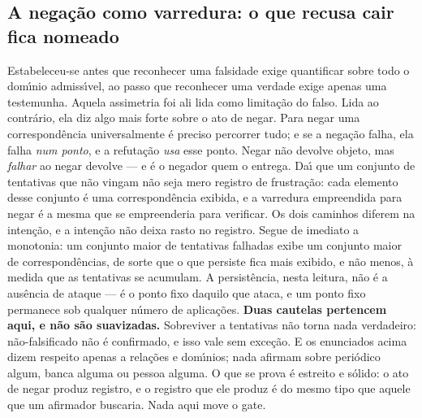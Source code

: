 \documentclass[11pt]{article}
\theoremstyle{definition}\newtheorem{deriv}{Derivação}
\begin{document}
\subsection*{A nega\c{c}\~ao como varredura: o que recusa cair fica nomeado}Estabeleceu-se antes que reconhecer uma falsidade exige quantificar sobre todo o dom\'\i{}nio admiss\'\i{}vel, ao passo que reconhecer uma verdade exige apenas uma testemunha. Aquela assimetria foi ali lida como limita\c{c}\~ao do falso. Lida ao contr\'ario, ela diz algo mais forte sobre o ato de negar. Para negar uma correspond\^encia universalmente \'e preciso percorrer tudo; e se a nega\c{c}\~ao falha, ela falha \emph{num ponto}, e a refuta\c{c}\~ao \emph{usa} esse ponto. Negar n\~ao devolve objeto, mas \emph{falhar} ao negar devolve --- e \'e o negador quem o entrega. Da\'\i{} que um conjunto de tentativas que n\~ao vingam n\~ao seja mero registro de frustra\c{c}\~ao: cada elemento desse conjunto \'e uma correspond\^encia exibida, e a varredura empreendida para negar \'e a mesma que se empreenderia para verificar. Os dois caminhos diferem na inten\c{c}\~ao, e a inten\c{c}\~ao n\~ao deixa rasto no registro. Segue de imediato a monotonia: um conjunto maior de tentativas falhadas exibe um conjunto maior de correspond\^encias, de sorte que o que persiste fica mais exibido, e n\~ao menos, \`a medida que as tentativas se acumulam. A persist\^encia, nesta leitura, n\~ao \'e a aus\^encia de ataque --- \'e o ponto fixo daquilo que ataca, e um ponto fixo permanece sob qualquer n\'umero de aplica\c{c}\~oes. \textbf{Duas cautelas pertencem aqui, e n\~ao s\~ao suavizadas.} Sobreviver a tentativas n\~ao torna nada verdadeiro: n\~ao-falsificado n\~ao \'e confirmado, e isso vale sem exce\c{c}\~ao. E os enunciados acima dizem respeito apenas a rela\c{c}\~oes e dom\'\i{}nios; nada afirmam sobre peri\'odico algum, banca alguma ou pessoa alguma. O que se prova \'e estreito e s\'olido: o ato de negar produz registro, e o registro que ele produz \'e do mesmo tipo que aquele que um afirmador buscaria. Nada aqui move o gate.
\end{document}
